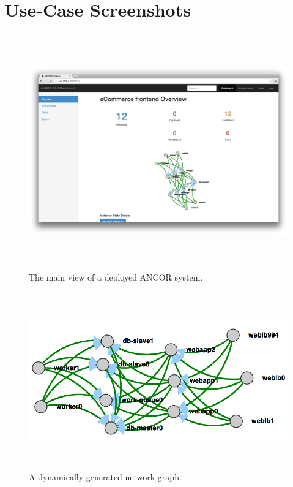 
\cleardoublepage

\chapter{\projectName{} Use-Case Screenshots}
\label{Appendix:Key1}

\begin{figure}[htb]%

    \includegraphics[height=4.0in]{figures/viewing-instances-main.png}

    \caption[The main view of a deployed ANCOR system.
    ]{The main view of a deployed ANCOR system.}

    \label{mainInstanceView}
\end{figure}

\begin{figure}[htb]%

    \includegraphics[height=3.0in]{figures/network-graph.png}

    \caption[D3.js Network Graph
    ]{A dynamically generated network graph.}

    \label{networkGraph}
\end{figure}

